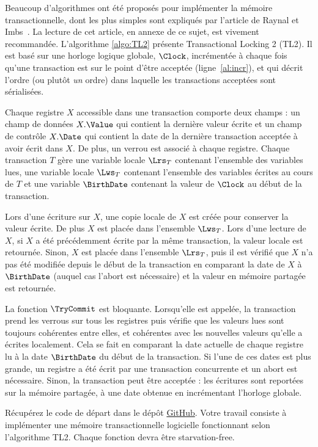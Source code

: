 Beaucoup d'algorithmes ont été proposés pour implémenter la mémoire transactionnelle, dont les plus simples
sont expliqués par l'article de Raynal et Imbs~\cite{IR}. La lecture de cet article,
en annexe de ce sujet, est vivement recommandée.
L'algorithme \ref{algo:TL2} présente Transactional Locking 2 (TL2).
Il est basé sur une horloge logique globale, $\Clock$,
incrémentée à chaque fois qu'une transaction
est sur le point d'être acceptée (ligne~\ref{al:incr}), et qui décrit l'ordre (ou plutôt \emph{un} ordre)
dans laquelle les transactions acceptées sont sérialisées.

Chaque registre $X$ accessible dans une transaction comporte deux champs : un champ de données
$X.\Value$ qui contient la dernière valeur écrite et un champ de contrôle $X.\Date$ qui
contient la date de la dernière transaction acceptée à avoir écrit dans $X$.
De plus, un verrou est associé à chaque registre.
%
Chaque transaction $T$ gère une variable locale $\Lrs_T$ contenant l'ensemble des variables lues,
une variable locale $\Lws_T$ contenant l'ensemble des variables écrites au cours de $T$
et une variable $\BirthDate$ contenant la valeur de $\Clock$ au début de la transaction.

Lors d'une écriture sur $X$, une copie locale de $X$ est créée pour conserver la valeur écrite.
De plus $X$ est placée dans l'ensemble $\Lws_T$.
Lors d'une lecture de $X$, si $X$ a été précédemment écrite par la même transaction,
la valeur locale est retournée. Sinon, $X$ est placée dans l'ensemble $\Lrs_T$,
puis il est vérifié que $X$ n'a pas été modifiée depuis le début de la transaction
en comparant la date de $X$ à $\BirthDate$
(auquel cas l'abort est nécessaire) et la valeur en mémoire partagée est retournée.

La fonction $\TryCommit$ est bloquante. Lorsqu'elle est appelée, la transaction prend les verrous
sur tous les registres puis vérifie que les valeurs lues sont toujours
cohérentes entre elles, et cohérentes avec les nouvelles valeurs qu'elle a écrites localement.
Cela se fait en comparant la date actuelle de chaque registre lu à la date $\BirthDate$
du début de la transaction. Si l'une de ces dates est plus grande, un registre a été écrit
par une transaction concurrente et un abort est nécessaire.
Sinon, la transaction peut être acceptée : les écritures sont reportées sur la mémoire partagée,
à une date obtenue en incrémentant l'horloge globale.

Récupérez le code de départ dans le dépôt \href{https://github.com/DistributedComputing/TP-transactions}{GitHub}.
Votre travail consiste à implémenter une mémoire transactionnelle logicielle fonctionnant selon l'algorithme TL2. Chaque fonction devra être starvation-free.

